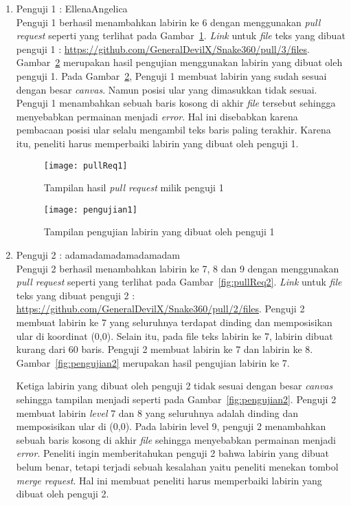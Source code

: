 \begin{enumerate}
	\item Penguji 1 : EllenaAngelica\\
	Penguji 1 berhasil menambahkan labirin ke 6 dengan menggunakan \textit{pull request} seperti yang terlihat pada Gambar~\ref{fig:pullReq1}. \textit{Link} untuk \textit{file} teks yang dibuat penguji 1 :  \url{https://github.com/GeneralDevilX/Snake360/pull/3/files}. Gambar~\ref{fig:pengujian1} merupakan hasil pengujian menggunakan labirin yang dibuat oleh penguji 1. Pada Gambar~\ref{fig:pengujian1}, Penguji 1 membuat labirin yang sudah sesuai dengan besar \textit{canvas}. Namun posisi ular yang dimasukkan tidak sesuai. Penguji 1 menambahkan sebuah baris kosong di akhir \textit{file} tersebut sehingga menyebabkan permainan menjadi \textit{error}. Hal ini disebabkan karena pembacaan posisi ular selalu mengambil teks baris paling terakhir. Karena itu, peneliti harus memperbaiki labirin yang dibuat oleh penguji 1.
	
	\begin{figure}[H]
		\centering  
		\texttt{[image: pullReq1]}  
		\caption[Tampilan hasil \textit{pull request} milik penguji 1]{Tampilan hasil \textit{pull request} milik penguji 1}
		\label{fig:pullReq1} 
	\end{figure}
	
	\begin{figure}[H]
		\centering  
		\texttt{[image: pengujian1]}  
		\caption[Tampilan pengujian labirin ke 6 yang dibuat oleh penguji 1]{Tampilan pengujian labirin yang dibuat oleh penguji 1}
		\label{fig:pengujian1} 
	\end{figure}	
	
	\item Penguji 2 : adamadamadamadamadam\\
	Penguji 2 berhasil menambahkan labirin ke 7, 8 dan 9 dengan menggunakan \textit{pull request} seperti yang terlihat pada Gambar~\ref{fig:pullReq2}. \textit{Link} untuk \textit{file} teks yang dibuat penguji 2 : \url{https://github.com/GeneralDevilX/Snake360/pull/2/files}. Penguji 2 membuat labirin ke 7 yang seluruhnya terdapat dinding dan memposisikan ular di koordinat (0,0). Selain itu, pada file teks labirin ke 7, labirin dibuat kurang dari 60 baris. Penguji 2 membuat labirin ke 7 dan labirin ke 8. Gambar~\ref{fig:pengujian2} merupakan hasil pengujian labirin ke 7.
	
	
	Ketiga labirin yang dibuat oleh penguji 2 tidak sesuai dengan besar \textit{canvas} sehingga tampilan menjadi seperti pada Gambar~\ref{fig:pengujian2}. Penguji 2 membuat labirin \textit{level} 7 dan 8 yang seluruhnya adalah dinding dan memposisikan ular di (0,0). Pada labirin level 9, penguji 2 menambahkan sebuah baris kosong di akhir \textit{file} sehingga menyebabkan permainan menjadi \textit{error}. Peneliti ingin memberitahukan penguji 2 bahwa labirin yang dibuat belum benar, tetapi terjadi sebuah kesalahan yaitu peneliti menekan tombol \textit{merge request}. Hal ini membuat peneliti harus memperbaiki labirin yang dibuat oleh penguji 2.
	

\end{enumerate}
